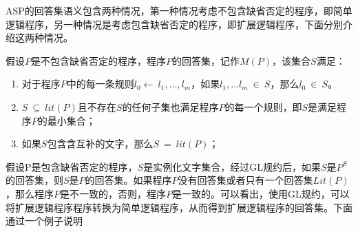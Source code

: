 ASP的回答集语义包含两种情况，第一种情况考虑不包含缺省否定的程序，即简单逻辑程序，另一种情况是考虑包含缺省否定的程序，即扩展逻辑程序，下面分别介绍这两种情况。
\begin{definition}[简单逻辑程序回答集]假设$P$是不包含缺省否定的程序，程序$P$的回答集，记作$M(P)$，该集合$S$满足：
    \begin{enumerate}[label=(\arabic*),topsep=0pt]
        \setlength\itemsep{-0.3em}
        \item 对于程序$P$中的每一条规则$l_0 \leftarrow \ l_1,...,l_m$，如果$l_1,...l_m \ \in \ S$，那么$l_0 \ \in \ S$。
        \item $S \ \subseteq \ lit(P)$且不存在$S$的任何子集也满足程序$P$的每一个规则，即$S$是满足程序$P$的最小集合；
        \item 如果$S$包含含互补的文字，那么$S \ = \ lit(P)$；
    \end{enumerate}
\end{definition}
\begin{definition}[扩展逻辑程序回答集]假设P是包含缺省否定的程序，$S$是实例化文字集合，经过GL规约后，如果$S$是$P^S$的回答集，则$S$是$P$的回答集。如果程序$P$没有回答集或者只有一个回答集$Lit(P)$，那么程序$P$是不一致的，否则，程序$P$是一致的。可以看出，使用GL规约，可以将扩展逻辑程序程序转换为简单逻辑程序，从而得到扩展逻辑程序的回答集。下面通过一个例子说明
\end{definition}

